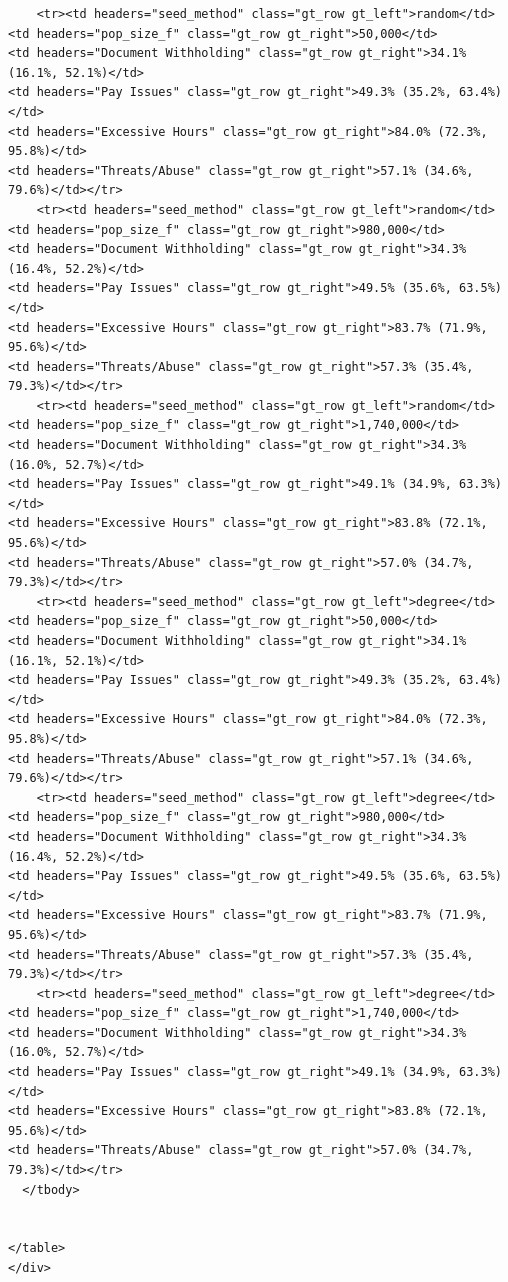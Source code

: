 \documentclass[
  12pt,
  letterpaper,
  DIV=11,
  numbers=noendperiod]{scrartcl}
\theoremstyle{plain}
\theoremstyle{definition}
\begin{document}
\begin{table}
{\begin{verbatim}
    <tr><td headers="seed_method" class="gt_row gt_left">random</td>
<td headers="pop_size_f" class="gt_row gt_right">50,000</td>
<td headers="Document Withholding" class="gt_row gt_right">34.1% (16.1%, 52.1%)</td>
<td headers="Pay Issues" class="gt_row gt_right">49.3% (35.2%, 63.4%)</td>
<td headers="Excessive Hours" class="gt_row gt_right">84.0% (72.3%, 95.8%)</td>
<td headers="Threats/Abuse" class="gt_row gt_right">57.1% (34.6%, 79.6%)</td></tr>
    <tr><td headers="seed_method" class="gt_row gt_left">random</td>
<td headers="pop_size_f" class="gt_row gt_right">980,000</td>
<td headers="Document Withholding" class="gt_row gt_right">34.3% (16.4%, 52.2%)</td>
<td headers="Pay Issues" class="gt_row gt_right">49.5% (35.6%, 63.5%)</td>
<td headers="Excessive Hours" class="gt_row gt_right">83.7% (71.9%, 95.6%)</td>
<td headers="Threats/Abuse" class="gt_row gt_right">57.3% (35.4%, 79.3%)</td></tr>
    <tr><td headers="seed_method" class="gt_row gt_left">random</td>
<td headers="pop_size_f" class="gt_row gt_right">1,740,000</td>
<td headers="Document Withholding" class="gt_row gt_right">34.3% (16.0%, 52.7%)</td>
<td headers="Pay Issues" class="gt_row gt_right">49.1% (34.9%, 63.3%)</td>
<td headers="Excessive Hours" class="gt_row gt_right">83.8% (72.1%, 95.6%)</td>
<td headers="Threats/Abuse" class="gt_row gt_right">57.0% (34.7%, 79.3%)</td></tr>
    <tr><td headers="seed_method" class="gt_row gt_left">degree</td>
<td headers="pop_size_f" class="gt_row gt_right">50,000</td>
<td headers="Document Withholding" class="gt_row gt_right">34.1% (16.1%, 52.1%)</td>
<td headers="Pay Issues" class="gt_row gt_right">49.3% (35.2%, 63.4%)</td>
<td headers="Excessive Hours" class="gt_row gt_right">84.0% (72.3%, 95.8%)</td>
<td headers="Threats/Abuse" class="gt_row gt_right">57.1% (34.6%, 79.6%)</td></tr>
    <tr><td headers="seed_method" class="gt_row gt_left">degree</td>
<td headers="pop_size_f" class="gt_row gt_right">980,000</td>
<td headers="Document Withholding" class="gt_row gt_right">34.3% (16.4%, 52.2%)</td>
<td headers="Pay Issues" class="gt_row gt_right">49.5% (35.6%, 63.5%)</td>
<td headers="Excessive Hours" class="gt_row gt_right">83.7% (71.9%, 95.6%)</td>
<td headers="Threats/Abuse" class="gt_row gt_right">57.3% (35.4%, 79.3%)</td></tr>
    <tr><td headers="seed_method" class="gt_row gt_left">degree</td>
<td headers="pop_size_f" class="gt_row gt_right">1,740,000</td>
<td headers="Document Withholding" class="gt_row gt_right">34.3% (16.0%, 52.7%)</td>
<td headers="Pay Issues" class="gt_row gt_right">49.1% (34.9%, 63.3%)</td>
<td headers="Excessive Hours" class="gt_row gt_right">83.8% (72.1%, 95.6%)</td>
<td headers="Threats/Abuse" class="gt_row gt_right">57.0% (34.7%, 79.3%)</td></tr>
  </tbody>
  
  
</table>
</div>
\end{verbatim}

}

\end{table}%
\end{document}
